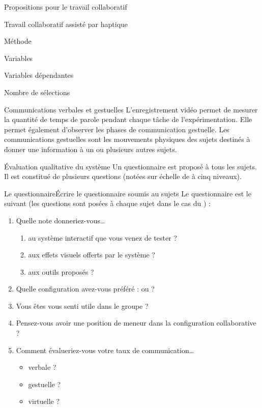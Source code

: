 \documentclass[myfrancais]{mythesis}
\begin{document}
\begin{mypart}{Propositions pour le travail collaboratif}
\begin{mychapter}{Travail collaboratif assisté par haptique}
\begin{mysection}{Méthode}
\begin{mysubsection}{Variables}
\begin{mysubsubsection}{Variables dépendantes}
\begin{myparagraph}{ Nombre de sélections}
						\end{myparagraph}
						\begin{myparagraph}{ Communications verbales et gestuelles}
							L'enregistrement vidéo permet de mesurer la quantité de temps de parole pendant chaque tâche de l'expérimentation.
							Elle permet également d'observer les phases de communication gestuelle.
							Les communications gestuelles sont les mouvements physiques des sujets destinés à donner une information à un ou plusieurs autres sujets.
						\end{myparagraph}
						\begin{myparagraph}{ Évaluation qualitative du système}
							Un questionnaire est proposé à tous les sujets.
							Il est constitué de plusieurs questions (notées sur échelle de  à cinq niveaux).

							\begin{myTodo}{Le questionnaire}{Écrire le questionnaire soumis au sujets}
								Le questionnaire est le suivant (les questions sont posées à chaque sujet dans le cas du ) :
								\begin{enumerate}
									\item Quelle note donneriez-vous\dots{}
										\begin{enumerate}
											\item au système interactif que vous venez de tester ?
											\item aux effets visuels offerts par le système ?
											\item aux outils proposés ?
										\end{enumerate}
									\item Quelle configuration avez-vous préféré :  ou  ?
									\item Vous êtes vous senti utile dans le groupe ?
									\item Pensez-vous avoir une position de meneur dans la configuration collaborative ?
									\item Comment évalueriez-vous votre taux de communication\dots{}
										\begin{itemize}
											\item verbale ?
											\item gestuelle ?
											\item virtuelle ?
										\end{itemize}
								\end{enumerate}
							\end{myTodo}


\end{myparagraph}
\end{mysubsubsection}
\end{mysubsection}
\end{mysection}
\end{mychapter}
\end{mypart}
\end{document}
